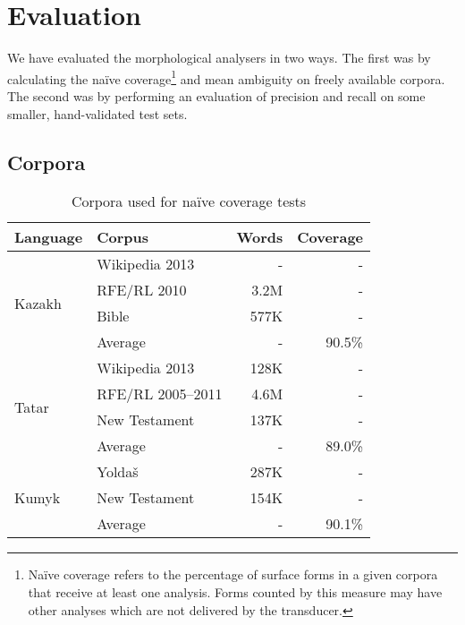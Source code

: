 \documentclass[a4paper,11pt,twocolumn]{article}
\begin{document}
\section{Evaluation}

We have evaluated the morphological analysers in two ways. The first was by calculating the naïve coverage\footnote{Naïve coverage refers to the percentage of surface forms in a given corpora that receive at least one analysis.  Forms counted by this measure may have other analyses which are not delivered by the transducer.} and mean ambiguity 
on freely available corpora. The second was by performing an evaluation of precision and recall on some 
smaller, hand-validated test sets.

\subsection{Corpora}



\begin{table}
\begin{center}
\begin{tabular}{llrr}
\toprule
\textbf{Language} & \textbf{Corpus} & \textbf{Words} & \textbf{Coverage} \\
\midrule
\multirow{4}{*}{Kazakh} & Wikipedia 2013 &  -  &  - \\
	& RFE/RL 2010 & 3.2M & - \\
	& Bible & 577K & - \\\cline{2-4}
	& Average & - & 90.5\% \\
\midrule
\multirow{4}{*}{Tatar} & Wikipedia 2013 & 128K &  - \\
	& RFE/RL 2005--2011 & 4.6M & - \\
	& New Testament & 137K & - \\\cline{2-4}
	& Average & - & 89.0\% \\
\midrule
\multirow{3}{*}{Kumyk} & Yoldaš & 287K &  - \\
	& New Testament & 154K & - \\\cline{2-4}
	& Average & - & 90.1\% \\
\bottomrule
\end{tabular}
 \caption{Corpora used for naïve coverage tests}
 \label{table:corpora}
\end{center}
\end{table}
\end{document}
